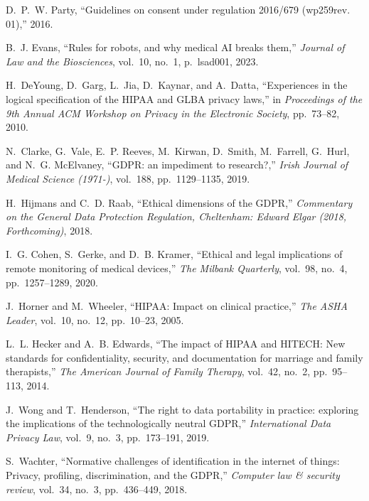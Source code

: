 \documentclass{article}
\begin{document}
\begin{thebibliography}{100}
	D.~P.~W. Party, ``Guidelines on consent under regulation 2016/679 (wp259rev.
	01),'' 2016.
	
	B.~J. Evans, ``Rules for robots, and why medical {AI} breaks them,'' {\em
		Journal of Law and the Biosciences}, vol.~10, no.~1, p.~lsad001, 2023.
	
	H.~DeYoung, D.~Garg, L.~Jia, D.~Kaynar, and A.~Datta, ``Experiences in the
	logical specification of the {HIPAA} and {GLBA} privacy laws,'' in {\em
		Proceedings of the 9th Annual ACM Workshop on Privacy in the Electronic
		Society}, pp.~73--82, 2010.
	
	N.~Clarke, G.~Vale, E.~P. Reeves, M.~Kirwan, D.~Smith, M.~Farrell, G.~Hurl, and
	N.~G. McElvaney, ``{GDPR}: an impediment to research?,'' {\em Irish Journal
		of Medical Science (1971-)}, vol.~188, pp.~1129--1135, 2019.
	
	H.~Hijmans and C.~D. Raab, ``Ethical dimensions of the {GDPR},'' {\em
		Commentary on the General Data Protection Regulation, Cheltenham: Edward
		Elgar (2018, Forthcoming)}, 2018.
	
	I.~G. Cohen, S.~Gerke, and D.~B. Kramer, ``Ethical and legal implications of
	remote monitoring of medical devices,'' {\em The Milbank Quarterly}, vol.~98,
	no.~4, pp.~1257--1289, 2020.
	
	J.~Horner and M.~Wheeler, ``{HIPAA}: Impact on clinical practice,'' {\em The
		ASHA Leader}, vol.~10, no.~12, pp.~10--23, 2005.
	
	L.~L. Hecker and A.~B. Edwards, ``The impact of {HIPAA} and {HITECH}: New
	standards for confidentiality, security, and documentation for marriage and
	family therapists,'' {\em The American Journal of Family Therapy}, vol.~42,
	no.~2, pp.~95--113, 2014.
	
	J.~Wong and T.~Henderson, ``The right to data portability in practice:
	exploring the implications of the technologically neutral {GDPR},'' {\em
		International Data Privacy Law}, vol.~9, no.~3, pp.~173--191, 2019.
	
	S.~Wachter, ``Normative challenges of identification in the internet of things:
	Privacy, profiling, discrimination, and the {GDPR},'' {\em Computer law \&
		security review}, vol.~34, no.~3, pp.~436--449, 2018.
	

\end{thebibliography}
\end{document}
